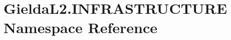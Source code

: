 \hypertarget{namespace_gielda_l2_1_1_i_n_f_r_a_s_t_r_u_c_t_u_r_e}{}\section{Gielda\+L2.\+I\+N\+F\+R\+A\+S\+T\+R\+U\+C\+T\+U\+RE Namespace Reference}
\label{namespace_gielda_l2_1_1_i_n_f_r_a_s_t_r_u_c_t_u_r_e}
